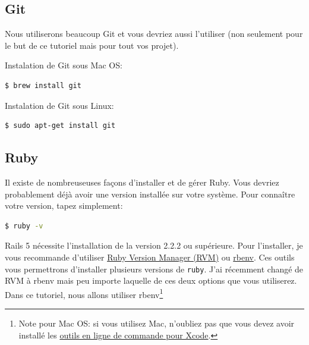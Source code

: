 \documentclass[]{report}
\begin{document}
    \subsection{Git}
      \label{setup_git}

      Nous utiliserons beaucoup Git et vous devriez aussi l'utiliser (non seulement pour le but de ce tutoriel mais pour tout vos projet).

      Instalation de Git sous Mac OS:
      \begin{scriptsize}
        \begin{lstlisting}[language=bash]
        $ brew install git
        \end{lstlisting}
      \end{scriptsize}

      Instalation de Git sous Linux:
      \begin{scriptsize}
        \begin{lstlisting}[language=bash]
        $ sudo apt-get install git
        \end{lstlisting}
      \end{scriptsize}

    \subsection{Ruby}

      Il existe de nombreuseuses façons d'installer et de gérer Ruby. Vous devriez probablement déjà avoir une version installée sur votre système. Pour connaître votre version, tapez simplement:

      \begin{scriptsize}
        \begin{lstlisting}[language=bash]
        $ ruby -v
        \end{lstlisting}
      \end{scriptsize}

      Rails 5 nécessite l'installation de la version 2.2.2 ou supérieure. Pour l'installer, je vous recommande d'utiliser \href{http://rvm.io/}{Ruby Version Manager (RVM)} ou \href{http://rbenv.org/}{rbenv}. Ces outils vous permettrons d'installer plusieurs versions de \verb|ruby|. J'ai récemment changé de RVM à rbenv mais peu importe laquelle de ces deux options que vous utiliserez. Dans ce tutoriel, nous allons utiliser rbenv\footnote{Note pour Mac OS: si vous utilisez Mac, n'oubliez pas que vous devez avoir installé les \href{https://developer.apple.com/downloads/}{outils en ligne de commande pour Xcode}.}
\end{document}

